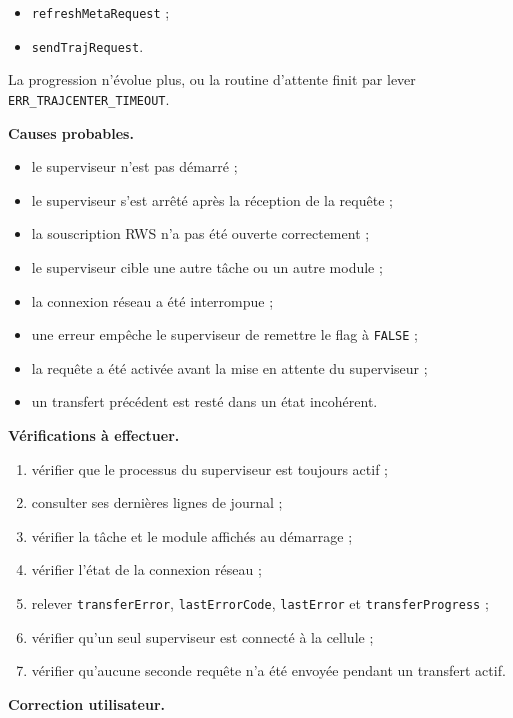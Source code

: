 \documentclass{rapportENSAM}
\begin{document}
\begin{itemize}
    \item \texttt{refreshMetaRequest} ;
    \item \texttt{sendTrajRequest}.
\end{itemize}

La progression n'évolue plus, ou la routine d'attente finit par lever
\texttt{ERR\_TRAJCENTER\_TIMEOUT}.

\textbf{Causes probables.}

\begin{itemize}
    \item le superviseur n'est pas démarré ;
    \item le superviseur s'est arrêté après la réception de la requête ;
    \item la souscription RWS n'a pas été ouverte correctement ;
    \item le superviseur cible une autre tâche ou un autre module ;
    \item la connexion réseau a été interrompue ;
    \item une erreur empêche le superviseur de remettre le flag à
    \texttt{FALSE} ;
    \item la requête a été activée avant la mise en attente du superviseur ;
    \item un transfert précédent est resté dans un état incohérent.
\end{itemize}

\textbf{Vérifications à effectuer.}

\begin{enumerate}
    \item vérifier que le processus du superviseur est toujours actif ;
    \item consulter ses dernières lignes de journal ;
    \item vérifier la tâche et le module affichés au démarrage ;
    \item vérifier l'état de la connexion réseau ;
    \item relever \texttt{transferError}, \texttt{lastErrorCode},
    \texttt{lastError} et \texttt{transferProgress} ;
    \item vérifier qu'un seul superviseur est connecté à la cellule ;
    \item vérifier qu'aucune seconde requête n'a été envoyée pendant un
    transfert actif.
\end{enumerate}

\textbf{Correction utilisateur.}
\end{document}
